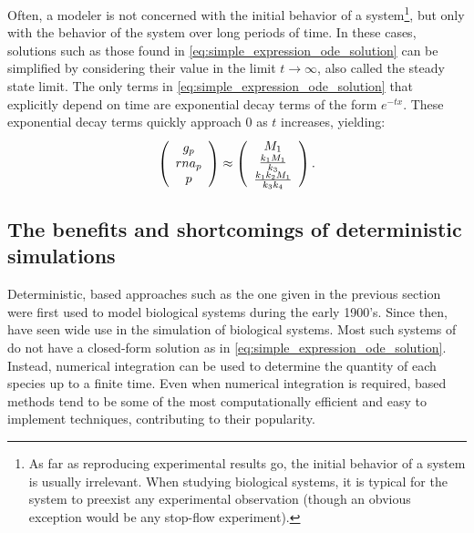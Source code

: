 Often, a modeler is not concerned with the initial behavior of a system\footnote{As far as reproducing experimental results go, the initial behavior of a system is usually irrelevant. When studying biological systems, it is typical for the system to preexist any experimental observation (though an obvious exception would be any stop-flow experiment).}, but only with the behavior of the system over long periods of time. In these cases, solutions such as those found in \eqref{eq:simple_expression_ode_solution} can be simplified by considering their value in the limit $t \rightarrow \infty$, also called the steady state limit. The only terms in \eqref{eq:simple_expression_ode_solution} that explicitly depend on time are exponential decay terms of the form $e^{-t x}$. These exponential decay terms quickly approach $0$ as $t$ increases, yielding:
\begin{gather*}\label{eq:simple_expression_ode_solution_ss}
    \left( \begin{array}{c}
        \con{g_p} \\
        \con{rna_p} \\
        \con{p}
    \end{array} \right) \approx
%
    \left( \begin{array}{c}
        \markmat_1 \\
        \frac{\condetx{1} \markmat_1}{\condetx{3}} \\
        \frac{\condetx{1} \condetx{2} \markmat_1}{\condetx{3} \condetx{4}}
    \end{array} \right).
\end{gather*}

\subsection{The benefits and shortcomings of deterministic simulations}

Deterministic,  based approaches such as the one given in the previous section were first used to model biological systems during the early 1900's\supercite{Lotka:1909ho,Lotka:1925tu,Dublin:1925hj,Volterra:1926cl}. Since then,  have seen wide use in the simulation of biological systems. Most such systems of  do not have a closed-form solution as in \eqref{eq:simple_expression_ode_solution}. Instead, numerical integration\supercite{Turing:1952df} can be used to determine the quantity of each species up to a finite time. Even when numerical integration is required,  based methods tend to be some of the most computationally efficient and easy to implement techniques, contributing to their popularity.

